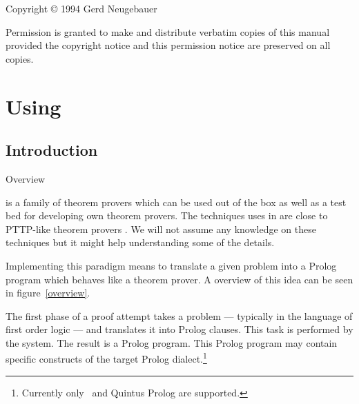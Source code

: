 \let\PrologFILE=\relax
\let\PredicateFileExtension=\relax

\makeindex
\initfloatingfigs

\maketitle
\null\vfill
Copyright {\copyright} 1994 Gerd Neugebauer
\medskip

Permission is granted to make and distribute verbatim copies of this manual
provided the copyright notice and this permission notice are preserved on all
copies.

\newpage %
\tableofcontents
\newpage %

\chapter{Using \ProCom}

\section{Introduction}

\begin{floatingfigure}{.4\textwidth}
  \begin{center}
    \mbox{}
    \caption{Overview}\label{overview}
  \end{center}
\end{floatingfigure}

\ProCom{} is a family of theorem provers which can be used out of the box as
well as a test bed for developing own theorem provers. The techniques uses in
\ProCom{} are close to PTTP-like theorem provers \cite{stickel:prolog}. We
will not assume any knowledge on these techniques but it might help
understanding some of the details.

Implementing this paradigm means to translate a given problem into a Prolog
program which behaves like a theorem prover. A overview of this idea can be
seen in figure~\ref{overview}.

The first phase of a proof attempt takes a problem --- typically in the
language of first order logic --- and translates it into Prolog clauses. This
task is performed by the \ProCom{} system. The result is a Prolog program.
This Prolog program may contain specific constructs of the target Prolog
dialect.\footnote{Currently only \eclipse\ and Quintus Prolog are supported.}


